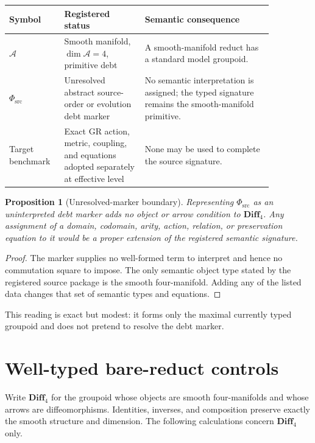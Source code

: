 \documentclass[11pt]{article}
\newtheorem{proposition}{Proposition}
\newcommand{\Sub}{\mathcal{A}}
\newcommand{\PhiSrc}{\Phi_{\mathrm{src}}}
\newcommand{\DiffFour}{\mathbf{Diff}_{4}}
\begin{document}
\begin{center}
\small
\begin{tabular}{>{\raggedright\arraybackslash}p{0.16\linewidth}
                >{\raggedright\arraybackslash}p{0.27\linewidth}
                >{\raggedright\arraybackslash}p{0.43\linewidth}}
\toprule
Symbol & Registered status & Semantic consequence \\
\midrule
\(\Sub\) & Smooth manifold, \(\dim\Sub=4\), primitive debt & A
smooth-manifold reduct has a standard model groupoid. \\
\(\PhiSrc\) & Unresolved abstract source-order or evolution debt marker & No
semantic interpretation is assigned; the typed signature remains the
smooth-manifold primitive. \\
Target benchmark & Exact GR action, metric, coupling, and equations adopted
separately at effective level & None may be used to complete the source
signature. \\
\bottomrule
\end{tabular}
\end{center}

\begin{proposition}[Unresolved-marker boundary]
Representing \(\PhiSrc\) as an uninterpreted debt marker adds no object or
arrow condition to \(\DiffFour\).  Any assignment of a domain, codomain,
arity, action, relation, or preservation equation to it would be a proper
extension of the registered semantic signature.
\end{proposition}

\begin{proof}
The marker supplies no well-formed term to interpret and hence no commutation
square to impose.  The only semantic object type stated by the registered
source package is the smooth four-manifold.  Adding any of the listed data
changes that set of semantic types and equations.
\end{proof}

This reading is exact but modest: it forms only the maximal currently typed
groupoid and does not pretend to resolve the debt marker.

\section{Well-typed bare-reduct controls}

Write \(\DiffFour\) for the groupoid whose objects are smooth
four-manifolds and whose arrows are diffeomorphisms.  Identities, inverses,
and composition preserve exactly the smooth structure and dimension.  The
following calculations concern \(\DiffFour\) only.
\end{document}
